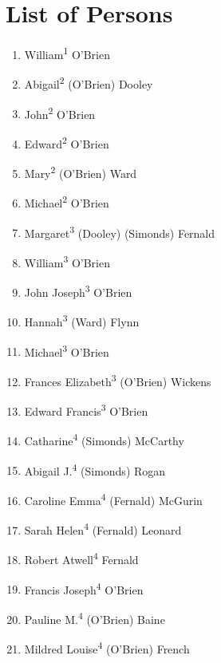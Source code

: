 \chapter{List of Persons}
\begin{enumerate}
	\item\label{per:William1OBrien}William\textsuperscript{1} O'Brien
	\item\label{per:Abigail2OBrien}Abigail\textsuperscript{2} (O'Brien) Dooley
	\item\label{per:John2OBrien}John\textsuperscript{2} O'Brien
	\item\label{per:Edward2OBrien}Edward\textsuperscript{2} O'Brien
	\item\label{per:Mary2OBrien}Mary\textsuperscript{2} (O'Brien) Ward
	\item\label{per:Michael2OBrien}Michael\textsuperscript{2} O'Brien
	\item\label{per:Margaret3Dooley}Margaret\textsuperscript{3} (Dooley) (Simonds) Fernald
	\item\label{per:William3OBrien}William\textsuperscript{3} O'Brien
	\item\label{per:John3OBrien}John Joseph\textsuperscript{3} O'Brien
	\item\label{per:Hannah3Ward}Hannah\textsuperscript{3} (Ward) Flynn
	\item\label{per:Michael3OBrien}Michael\textsuperscript{3} O'Brien
	\item\label{per:Frances3OBrien}Frances Elizabeth\textsuperscript{3} (O'Brien) Wickens
	\item\label{per:Edward3OBrien}Edward Francis\textsuperscript{3} O'Brien
	\item\label{per:Catharine4Simonds}Catharine\textsuperscript{4} (Simonds) McCarthy
	\item\label{per:Abigail4Simonds}Abigail J.\textsuperscript{4} (Simonds) Rogan
	\item\label{per:Caroline4Fernald}Caroline Emma\textsuperscript{4} (Fernald) McGurin
	\item\label{per:Sarah4Fernald}Sarah Helen\textsuperscript{4} (Fernald) Leonard
	\item\label{per:Robert4Fernald}Robert Atwell\textsuperscript{4} Fernald
	\item\label{per:Francis4OBrien}Francis Joseph\textsuperscript{4} O'Brien
	\item\label{per:Pauline4OBrien}Pauline M.\textsuperscript{4} (O'Brien) Baine
	\item\label{per:Mildred4OBrien}Mildred Louise\textsuperscript{4} (O'Brien) French
\end{enumerate}

